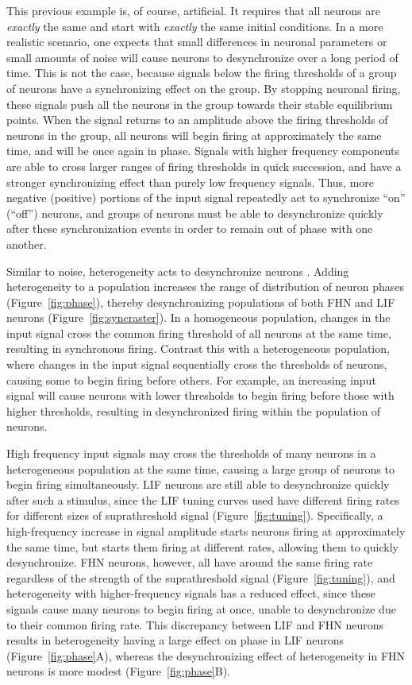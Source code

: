 \documentclass[12pt]{article}
\begin{document}
This previous example is, of course, artificial. It requires that all neurons are \emph{exactly} the same and start with \emph{exactly} the same initial conditions. In a more realistic scenario, one expects that small differences in neuronal parameters or small amounts of noise will cause neurons to desynchronize over a long period of time. This is not the case, because signals below the firing thresholds of a group of neurons have a synchronizing effect on the group. By stopping neuronal firing, these signals push all the neurons in the group towards their stable equilibrium points. When the signal returns to an amplitude above the firing thresholds of neurons in the group, all neurons will begin firing at approximately the same time, and will be once again in phase. Signals with higher frequency components are able to cross larger ranges of firing thresholds in quick succession, and have a stronger synchronizing effect than purely low frequency signals. Thus, more negative (positive) portions of the input signal repeatedly act to synchronize ``on'' (``off'') neurons, and groups of neurons must be able to desynchronize quickly after these synchronization events in order to remain out of phase with one another.

Similar to noise, heterogeneity acts to desynchronize neurons \citep{Burton2012}. Adding heterogeneity to a population increases the range of distribution of neuron phases (Figure~\ref{fig:phase}), thereby desynchronizing populations of both FHN and LIF neurons (Figure~\ref{fig:syncraster}). In a homogeneous population, changes in the input signal cross the common firing threshold of all neurons at the same time, resulting in synchronous firing. Contrast this with a heterogeneous population, where changes in the input signal sequentially cross the thresholds of neurons, causing some to begin firing before others. For example, an increasing input signal will cause neurons with lower thresholds to begin firing before those with higher thresholds, resulting in desynchronized firing within the population of neurons.

High frequency input signals may cross the thresholds of many neurons in a heterogeneous population at the same time, causing a large group of neurons to begin firing simultaneously. LIF neurons are still able to desynchronize quickly after such a stimulus, since the LIF tuning curves used have different firing rates for different sizes of suprathreshold signal (Figure~\ref{fig:tuning}). Specifically, a high-frequency increase in signal amplitude starts neurons firing at approximately the same time, but starts them firing at different rates, allowing them to quickly desynchronize. FHN neurons, however, all have around the same firing rate regardless of the strength of the suprathreshold signal (Figure~\ref{fig:tuning}), and heterogeneity with higher-frequency signals has a reduced effect, since these signals cause many neurons to begin firing at once, unable to desynchronize due to their common firing rate. This discrepancy between LIF and FHN neurons results in heterogeneity having a large effect on phase in LIF neurons (Figure~\ref{fig:phase}A), whereas the desynchronizing effect of heterogeneity in FHN neurons is more modest (Figure~\ref{fig:phase}B).
\end{document}

